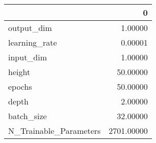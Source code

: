 \begin{tabular}{lr}
\toprule
{} &           0 \\
\midrule
output\_dim             &     1.00000 \\
learning\_rate          &     0.00001 \\
input\_dim              &     1.00000 \\
height                 &    50.00000 \\
epochs                 &    50.00000 \\
depth                  &     2.00000 \\
batch\_size             &    32.00000 \\
N\_Trainable\_Parameters &  2701.00000 \\
\bottomrule
\end{tabular}
